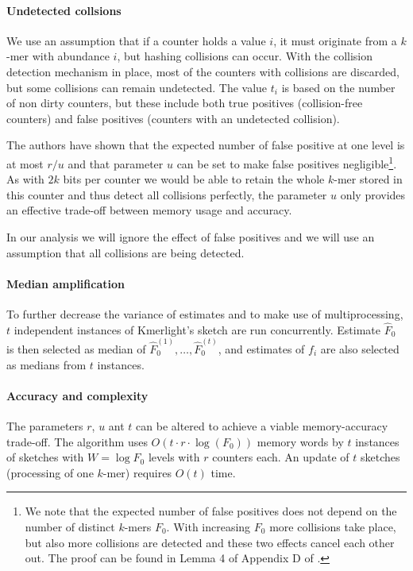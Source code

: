 \paragraph{Undetected collsions}
We use an assumption that if a counter holds a value $i$, it must originate from a $k$-mer 
with abundance $i$, but hashing collisions can occur. With the collision detection mechanism
in place, most of the counters with collisions are discarded, but some collisions can remain
undetected. The value $t_i$ is based on the number of non dirty counters, but these include both
true positives (collision-free counters) and false positives (counters with an undetected
collision). 

The authors have shown that the expected number of false positive at one level
is at most $r/u$ and that parameter $u$ can be set to make false positives negligible\footnote{We 
note that the expected number of false positives does not depend on
the number of distinct $k$-mers $F_0$. With increasing $F_0$ more collisions take place,
but also more collisions are detected and these two effects cancel each other out. 
The proof can be found in Lemma 4 of Appendix D of \cite{Sivadasan2016}.}. As with $2k$ 
bits per counter we would be able to retain the whole $k$-mer stored in this 
counter and thus detect all collisions perfectly, the parameter $u$ only provides 
an effective trade-off between memory usage and accuracy.

In our analysis we will ignore the effect of false positives and we will use an assumption
that all collisions are being detected.

\paragraph{Median amplification}
To further decrease the variance of estimates and to make use of multiprocessing, 
$t$ independent instances of Kmerlight's sketch are run concurrently.
Estimate $\hat F_0$ is then selected as median of $\hat F_0^{(1)}, \dots, \hat F_0^{(t)}$, 
and estimates of $f_i$ are also selected as medians from $t$ instances. 

\paragraph{Accuracy and complexity}
The parameters $r$, $u$ ant $t$ can be altered to achieve a viable memory-accuracy trade-off.
The algorithm uses $O(t \cdot r \cdot \log(F_0))$ memory words by $t$ instances of sketches
with $W = \log F_0$ levels with $r$ counters each. 
An update of $t$ sketches (processing of one $k$-mer) requires $O(t)$ time.

